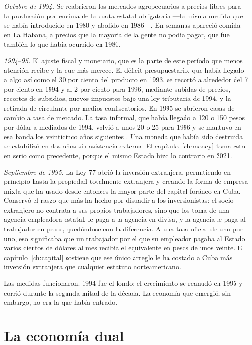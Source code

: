 \emph{Octubre de 1994.} Se reabrieron los mercados agropecuarios a precios libres
para la producción por encima de la cuota estatal obligatoria ---la misma medida
que se había introducido en 1980 y abolido en 1986---. En semanas apareció comida
en La Habana, a precios que la mayoría de la gente no podía pagar, que fue también
lo que había ocurrido en 1980.

\emph{1994--95.} El ajuste fiscal y monetario, que es la parte de este período
que menos atención recibe y la que más merece. El déficit presupuestario, que
había llegado a algo así como el 30 por ciento del producto en 1993, se recortó a
alrededor del 7 por ciento en 1994 y al 2 por ciento para 1996, mediante subidas
de precios, recortes de subsidios, nuevos impuestos bajo una ley tributaria de
1994, y la retirada de circulante por medios confiscatorios. En 1995 se abrieron
casas de cambio a tasa de mercado. La tasa informal, que había llegado a 120 o 150
pesos por dólar a mediados de 1994, volvió a unos 20 o 25 para 1996 y se mantuvo
en esa banda los veinticinco años siguientes \citep{mesalago2005}.\unv{} Una
moneda que había sido destruida se estabilizó en dos años sin asistencia externa.
El capítulo~\ref{ch:money} toma esto en serio como precedente, porque el mismo
Estado hizo lo contrario en 2021.

\emph{Septiembre de 1995.} La Ley 77 abrió la inversión extranjera, permitiendo
en principio hasta la propiedad totalmente extranjera y creando la forma de
empresa mixta que ha usado desde entonces la mayor parte del capital foráneo en
Cuba. Conservó el rasgo que más ha hecho por disuadir a los inversionistas: el
socio extranjero no contrata a sus propios trabajadores, sino que los toma de una
agencia empleadora estatal, le paga a la agencia en divisa, y la agencia le paga
al trabajador en pesos, quedándose con la diferencia. A una tasa oficial de uno
por uno, eso significaba que un trabajador por el que su empleador pagaba al
Estado varios cientos de dólares al mes recibía el equivalente en pesos de unos
veinte. El capítulo~\ref{ch:capital} sostiene que ese único arreglo le ha costado
a Cuba más inversión extranjera que cualquier estatuto norteamericano.

Las medidas funcionaron. 1994 fue el fondo; el crecimiento se reanudó en 1995 y
corrió durante la segunda mitad de la década. La economía que emergió, sin
embargo, no era la que había entrado.

\section{La economía dual}

